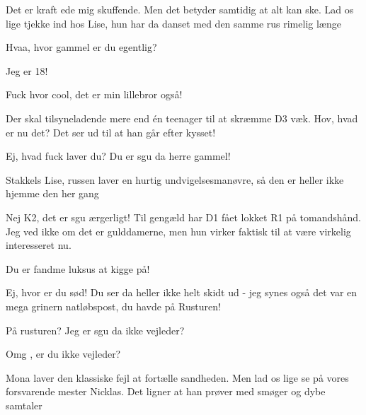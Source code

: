 \documentclass[a4paper,11pt]{article}
\begin{document}
\begin{sketch}
 Det er kraft ede mig skuffende. Men det betyder samtidig at alt kan ske. Lad os lige tjekke ind hos Lise, hun har da danset med den samme rus rimelig længe


 Hvaa, hvor gammel er du egentlig?

 Jeg er 18!


 Fuck hvor cool, det er min lillebror også!


 Der skal tilsyneladende mere end én teenager til at skræmme D3 væk. Hov, hvad er nu det? Det ser ud til at han går efter kysset!


 Ej, hvad fuck laver du? Du er sgu da herre gammel!


 Stakkels Lise, russen laver en hurtig undvigelsesmanøvre, så den er heller ikke hjemme den her gang

 Nej K2, det er sgu ærgerligt! Til gengæld har D1 fået lokket R1 på tomandshånd. Jeg ved ikke om det er gulddamerne, men hun virker faktisk til at være virkelig interesseret nu.


 Du er fandme luksus at kigge på!

 Ej, hvor er du sød! Du ser da heller ikke helt skidt ud - jeg synes også det var en mega grinern natløbspost, du havde på Rusturen!

 På rusturen? Jeg er sgu da ikke vejleder?

 Omg , er du ikke vejleder? 

 Mona laver den klassiske fejl at fortælle sandheden. Men lad os lige se på vores forsvarende mester Nicklas. Det ligner at han prøver med smøger og dybe samtaler



\end{sketch}
\end{document}
